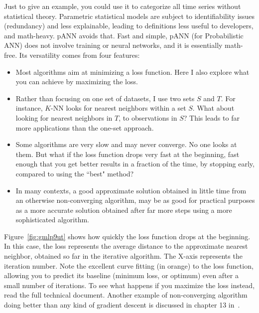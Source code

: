 \documentclass[oneside,10pt]{book}
\begin{document}
Just to give an example, you could use it to categorize all time series without statistical theory. Parametric statistical models are 
subject to \textcolor{index}{identifiability} issues (redundancy) and less explainable, leading to definitions less useful to developers, and math-heavy.  \textcolor{index}{pANN} avoids that.
Fast and simple, pANN (for Probabilistic ANN) does not involve training or neural networks, and it is essentially math-free. Its versatility comes from four features:
\vspace{1ex}
\begin{itemize}
\item Most algorithms aim at minimizing a loss function. Here I also explore what you can achieve by maximizing the loss.
\item Rather than focusing on one set of datasets, I use two sets $S$ and $T$. For instance, 
\textcolor{index}{$K$-NN} looks for nearest neighbors within a set $S$. What about looking for nearest neighbors in $T$, to observations in $S$? This leads to far more applications than the one-set approach.
\item Some algorithms are very slow and may never converge. No one looks at them. But what if the loss function drops very fast at the beginning, fast enough that you get better results in a fraction of the time, by stopping early, compared to using the ``best" method?
\item In many contexts, a good approximate solution obtained in little time from an otherwise non-converging algorithm, may be as good for practical purposes as a more accurate solution obtained after far more steps using a more sophisticated algorithm.
\end{itemize}
\vspace{1ex}
\noindent Figure~\ref{fig:gmlp9ut} shows how quickly the loss function drops at the beginning. In this case, the loss represents the average distance to the approximate nearest neighbor, obtained so far in the iterative algorithm. The X-axis represents the iteration number. Note the excellent curve fitting (in orange) to the loss function, allowing you to predict its baseline (minimum loss, or optimum) even after a small number of iterations. To see what happens if you maximize the loss instead, read the full technical document. Another example of non-converging algorithm doing better than any kind of \textcolor{index}{gradient descent} is discussed in chapter 13 in~\cite{vgelsevier}.
\end{document}
